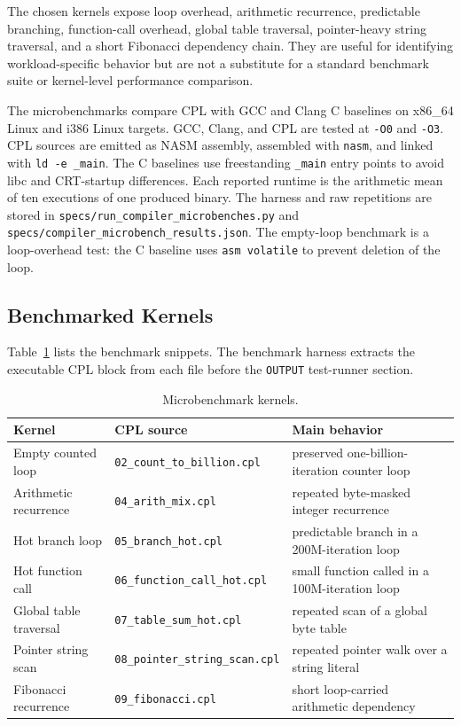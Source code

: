 \documentclass[10pt,twocolumn]{article}
\begin{document}
\par The chosen kernels expose loop overhead, arithmetic recurrence, predictable branching, function-call overhead, global table traversal, pointer-heavy string traversal, and a short Fibonacci dependency chain. They are useful for identifying workload-specific behavior but are not a substitute for a standard benchmark suite or kernel-level performance comparison.

\par The microbenchmarks compare CPL with GCC and Clang C baselines on x86\_64 Linux and i386 Linux targets. GCC, Clang, and CPL are tested at \texttt{-O0} and \texttt{-O3}. CPL sources are emitted as NASM assembly, assembled with \texttt{nasm}, and linked with \texttt{ld -e \_main}. The C baselines use freestanding \texttt{\_main} entry points to avoid libc and CRT-startup differences. Each reported runtime is the arithmetic mean of ten executions of one produced binary. The harness and raw repetitions are stored in \texttt{specs/run\_compiler\_microbenches.py} and \texttt{specs/compiler\_microbench\_results.json}. The empty-loop benchmark is a loop-overhead test: the C baseline uses \texttt{asm volatile} to prevent deletion of the loop.

\subsection{Benchmarked Kernels}

\par Table~\ref{tab:bench-kernels} lists the benchmark snippets. The benchmark harness extracts the executable CPL block from each file before the \texttt{OUTPUT} test-runner section.

\begin{table}[t]
\centering
\caption{Microbenchmark kernels.}
\label{tab:bench-kernels}
\begin{tabular}{lll}
    \toprule
    Kernel & CPL source & Main behavior \\
    \midrule
    Empty counted loop & \texttt{02\_count\_to\_billion.cpl} & preserved one-billion-iteration counter loop \\
    Arithmetic recurrence & \texttt{04\_arith\_mix.cpl} & repeated byte-masked integer recurrence \\
    Hot branch loop & \texttt{05\_branch\_hot.cpl} & predictable branch in a 200M-iteration loop \\
    Hot function call & \texttt{06\_function\_call\_hot.cpl} & small function called in a 100M-iteration loop \\
    Global table traversal & \texttt{07\_table\_sum\_hot.cpl} & repeated scan of a global byte table \\
    Pointer string scan & \texttt{08\_pointer\_string\_scan.cpl} & repeated pointer walk over a string literal \\
    Fibonacci recurrence & \texttt{09\_fibonacci.cpl} & short loop-carried arithmetic dependency \\
    \bottomrule
\end{tabular}
\end{table}
\end{document}
